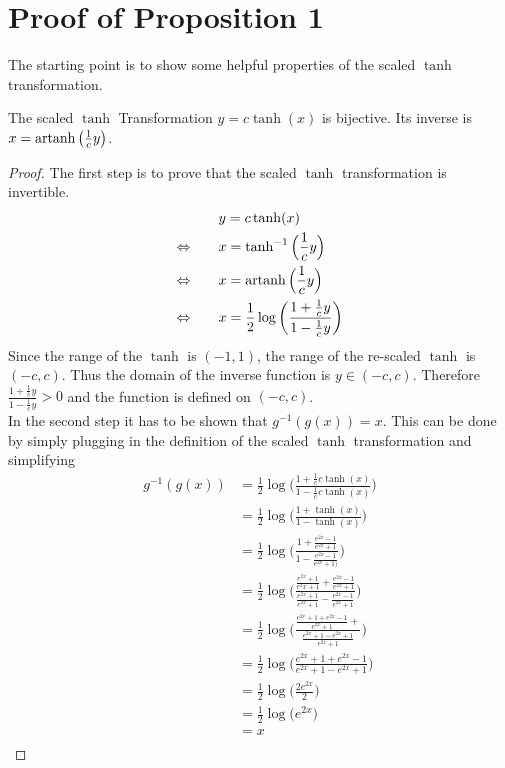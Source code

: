 \section{Proof of Proposition 1}\label{proof:log_abs_det_jacobian}
The starting point is to show some helpful properties of the scaled $\tanh$ transformation.
\begin{lemma}\label{lem:tanh_bijective}
The scaled $\tanh$ Transformation $y = c \tanh (x)$ is bijective. Its inverse is $x = \operatorname{artanh} \big(\frac{1}{c}y \big)$.
\end{lemma}
\begin{proof}
The first step is to prove that the scaled $\tanh$ transformation is invertible.
\begin{align}
     & y = c \tanh (x) \nonumber \\
     \Leftrightarrow \qquad & x = \tanh^{-1} \Big(\frac{1}{c}y \Big) \nonumber \\
     \Leftrightarrow \qquad & x = \operatorname{artanh} \Big(\frac{1}{c}y \Big) \nonumber \\
     \Leftrightarrow \qquad & x = \frac{1}{2} \log \bigg( \frac{1 + \frac{1}{c} y}{1 - \frac{1}{c} y } \bigg) \nonumber \\
\end{align}
Since the range of the $\tanh$ is $(-1, 1)$, the range of the re-scaled $\tanh$ is $(-c, c)$. Thus the domain of the inverse function is $y \in (-c, c)$. Therefore $\frac{1 + \frac{1}{c} y}{1 - \frac{1}{c} y } > 0$ and the function is defined on $(-c, c)$.\\
In the second step it has to be shown that $g^{-1}(g(x))=x$. This can be done by simply plugging in the definition of the scaled $\tanh$ transformation and simplifying
\begin{align}
     g^{-1}(g(x)) & = \frac{1}{2} \log \bigg( \frac{1 + \frac{1}{c} c \tanh (x)}{1 - \frac{1}{c} c \tanh (x)} \bigg) \nonumber \\
     & = \frac{1}{2} \log \bigg( \frac{ 1 + \tanh (x) }{ 1 -  \tanh (x) } \bigg) \nonumber \\
     & = \frac{1}{2} \log \bigg( \frac{1 + \frac{e^{2x} - 1}{e^{2x} + 1}}{1 -  \frac{e^{2x} - 1}{e^{2x} + 1)}} \bigg) \nonumber \\
     & = \frac{1}{2} \log \bigg( \frac{\frac{e^{2x} + 1}{ e^2x + 1} + \frac{ e^{2x} - 1 }{ e^{2x} + 1 }}{\frac{ e^{2x} + 1 }{   e^{2x} + 1 } -  \frac{ e^{2x} - 1 }{ e^{2x} + 1 }} \bigg) \nonumber \\
     & = \frac{1}{2} \log \bigg( \frac{\frac{e^{2x} + 1 + e^{2x} - 1 }{ e^{2x} + 1 } +}{\frac{ e^{2x} + 1 - e^{2x} + 1 }{ e^{2x} + 1}} \bigg) \nonumber \\
      & = \frac{1}{2} \log \bigg( \frac{e^{2x} + 1 + e^{2x} - 1}{e^{2x} + 1 - e^{2x} + 1} \bigg) \nonumber \\
      & = \frac{1}{2} \log \bigg( \frac{2e^{2x}}{2} \bigg) \nonumber \\
      & = \frac{1}{2} \log \bigg(e^{2x} \bigg) \nonumber \\
      & = x\nonumber \\
\end{align}
\end{proof}

